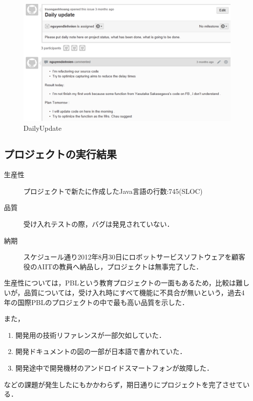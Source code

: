 \documentclass[a4j, 12Q, twocolumn, twoside]{jsarticle}
\begin{document}
\begin{figure}[htb]
  \begin{center}
    \includegraphics[width=\columnwidth]{./figures/DailyUPDate.png}
    \caption{DailyUpdate}
    \label{fig:dailyupdate}
  \end{center}
\end{figure}

\subsection{プロジェクトの実行結果}
\begin{description}
 \item[生産性] プロジェクトで新たに作成したJava言語の行数:745(SLOC)
 \item[品質] 受け入れテストの際，バグは発見されていない．
 \item[納期]スケジュール通り2012年8月30日にロボットサービスソフトウェアを顧客役のAIITの教員へ納品し，プロジェクトは無事完了した．
\end{description}

生産性については，PBLという教育プロジェクトの一面もあるため，比較は難しいが，品質については，受け入れ時にすべて機能に不具合が無いという，過去4年の国際PBLのプロジェクトの中で最も高い品質を示した．

また，

\begin{enumerate}
 \item 開発用の技術リファレンスが一部欠如していた．
 \item 開発ドキュメントの図の一部が日本語で書かれていた．
 \item 開発途中で開発機材のアンドロイドスマートフォンが故障した．
\end{enumerate}

などの課題が発生したにもかかわらず，期日通りにプロジェクトを完了させている．
\end{document}
